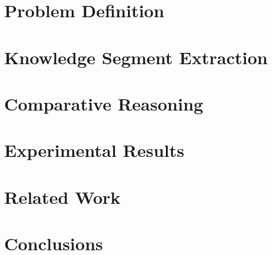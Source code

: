 \documentclass[11pt]{article}
\begin{document}
\section{Problem Definition}\label{problem_definition}


\section{Knowledge Segment Extraction}\label{ks_extractt}

%

%

\section{Comparative Reasoning}\label{methods}


\section{Experimental Results} \label{experiments}


\section{Related Work}\label{related-work}



\section{Conclusions}\label{conclusion}



%




%
%

\end{document}
